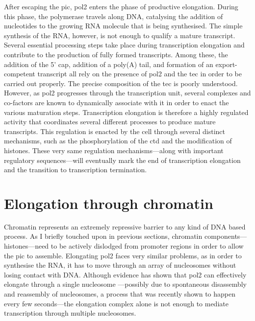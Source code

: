 After escaping the \gls{pic}, \gls{pol2} enters the phase of productive elongation.
During this phase, the polymerase travels along DNA, catalysing the addition of nucleotides to the growing RNA molecule that is being synthesised.
The simple synthesis of the RNA, however, is not enough to qualify a mature transcript.
Several essential processing steps take place during transcription elongation and contribute to the production of fully formed transcripts.
Among these, the addition of the 5' cap, addition of a poly(A) tail, and formation of an export-competent transcript all rely on the presence of \gls{pol2} and the \gls{tec} in order to be carried out properly.
The precise composition of the \gls{tec} is poorly understood. 
However, as \gls{pol2} progresses through the transcription unit, several complexes and co-factors are known to dynamically associate with it in order to enact the various maturation steps.  
Transcription elongation is therefore a highly regulated activity that coordinates several different processes to produce mature transcripts.
This regulation is enacted by the cell through several distinct mechanisms, such as the phosphorylation of the \gls{ctd} and the modification of histones.
These very same regulation mechanisms---along with important regulatory sequences---will eventually mark the end of transcription elongation and the transition to transcription termination.

\section{Elongation through chromatin}
Chromatin represents an extremely repressive barrier to any kind of DNA based process.
As I briefly touched upon in previous sections, chromatin components---histones---need to be actively dislodged from promoter regions in order to allow the \acrlong{pic} to assemble.
Elongating \gls{pol2} faces very similar problems, as in order to synthesise the RNA, it has to move through an array of nucleosomes without losing contact with DNA.
Although \invitro{} evidence has shown that \gls{pol2} can effectively elongate through a single nucleosome \citep{lorch:1987:nucleosomes}---possibly due to spontaneous disassembly and reassembly of nucleosomes, a process that was recently shown to happen every few seconds\citep{kim:2016:singlemolecule}---the elongation complex alone is not enough to mediate transcription through multiple nucleosomes.

